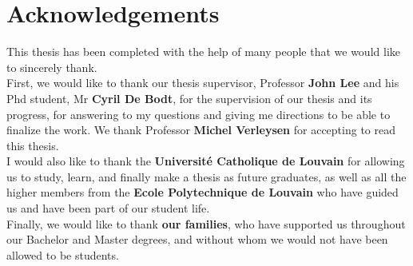 \section*{Acknowledgements}

This thesis has been completed with the help of many people that we would like to sincerely thank.\\ 

\noindent First, we would like to thank our thesis supervisor, Professor \textbf{John Lee} and his Phd student, Mr \textbf{Cyril De Bodt}, for the supervision of our thesis and its progress, for answering to my questions and giving me directions to be able to finalize the work. We thank Professor \textbf{Michel Verleysen} for accepting to read this thesis.\\

\noindent I would also like to thank the \textbf{Université Catholique de Louvain} for allowing us to study, learn, and finally make a thesis as future graduates, as well as all the higher members from the \textbf{Ecole Polytechnique de Louvain} who have guided us and have been part of our student life.\\

\noindent Finally, we would like to thank \textbf{our families}, who have supported us throughout our Bachelor and Master degrees, and without whom we would not have been allowed to be students.
